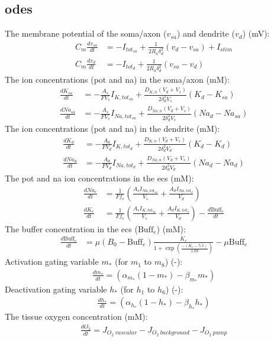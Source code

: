 \documentclass[11pt]{elsarticle}
\newcommand{\na}{\gls{na}\xspace}
\newcommand{\pot}{\gls{pot}\xspace}
\begin{document}
\subsection{\Glspl{ode}}
The membrane potential of the soma/axon ($v_{sa}$) and dendrite ($v_d$) (mV):
	\begin{align}
	C_{m}\frac{d v_{sa}}{d t} 	&= -I_{tot_{sa}}+\frac{1}{2R_a\delta_d^{2}}(v_d-v_{sa})+I_{stim} \\
	C_{m}\frac{d v_d}{d t} 		&= -I_{tot_d}+\frac{1}{2R_a\delta_d^{2}}(v_{sa}-v_d)
	\end{align}
%	
The ion concentrations (\pot and \na) in the soma/axon (mM):
	\begin{align} 
	\frac{d K_{sa}}{dt} &= -\frac{A_s}{F V_s} I_{K,tot_{sa}} + \frac{D_{K,n}(V_d + V_s)} {2 \delta_d^2 V_s} (K_d - K_{sa}) \\
	\frac{d Na_{sa}}{dt} &= -\frac{A_s}{F V_s} I_{Na,tot_{sa}} + \frac{D_{Na,n}(V_d + V_s)} {2 \delta_d^2 V_s} (Na_d - Na_{sa})
	\end{align}
%
The ion concentrations (\pot and \na) in the dendrite (mM):
	\begin{align} 
	\frac{d K_{d}}{dt} &= -\frac{A_d}{F V_d} I_{K,tot_{d}} + \frac{D_{K,n}(V_d + V_s)} {2 \delta_d^2 V_d} (K_d - K_{d}) \\
	\frac{d Na_{d}}{dt} &= -\frac{A_d}{F V_d} I_{Na,tot_{d}} + \frac{D_{Na, n}(V_d + V_s)} {2 \delta_d^2 V_d} (Na_d - Na_{d})
	\end{align}
%
The \pot and \na ion concentrations in the \gls{ecs} (mM):	
	\begin{align}
	\frac{d Na_e}{dt} &= \frac{1}{F f_e} \left( \frac{A_s I_{Na,tot_{sa}}}{V_s} + \frac{A_d I_{Na,tot_d}}{V_d} \right) \\
	\frac{d K_e}{dt} &= \frac{1}{F f_e} \left( \frac{A_s I_{K,tot_{sa}}}{V_s} + \frac{A_d I_{K,tot_d}}{V_d} \right) - \frac{d \text{Buff}_e}{dt}
	\end{align}	
%
The buffer concentration in the \gls{ecs} ($\text{Buff}_e$) (mM):
	\begin{align}
	\frac{d\text{Buff}_e}{dt} &= \mu (B_0 - \text{Buff}_e) \frac{K_e}{1 + \exp\left( \frac{-(K_e - 5.5)}{1.09} \right)} - \mu \text{Buff}_e
	\end{align}
%
Activation gating variable $m_*$ (for $m_1$ to $m_8$) (-):
	\begin{align}
	\frac{d m_*}{dt} = \left( \alpha_{m_*} (1-m_*) - \beta_{m_*} m_*  \right)
	\end{align}
%	
Deactivation gating variable $h_*$ (for $h_1$ to $h_6$) (-):
	\begin{align}
	\frac{d h_*}{dt} =  \left( \alpha_{h_*} (1-h_*) - \beta_{h_*} h_*  \right)
	\end{align}
The tissue oxygen concentration (mM):	
	\begin{align}
	\frac{d O_2}{dt} = J_{O_2 \: vascular} - J_{O_2 \: background} - J_{O_2 \: pump}
	\end{align}
%
\end{document}
